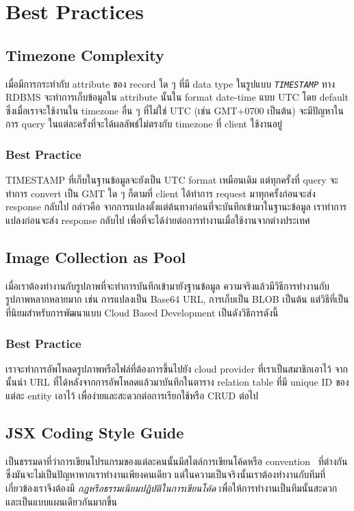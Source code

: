 \section{Best Practices}
\subsection{Timezone Complexity}
เมื่อมีการกระทำกับ attribute ของ record ใด ๆ ที่มี data type ในรูปแบบ \textit{\texttt{TIMESTAMP}} ทาง RDBMS จะทำการเก็บข้อมูลใน attribute นั้นใน format date-time แบบ UTC โดย default ซึ่งเมื่อเราจะใช้งานใน timezone อื่น ๆ ที่ไม่ใช่ UTC (เช่น GMT+0700 เป็นต้น) จะมีปัญหาในการ query ในแต่ละครั้งที่จะได้ผลลัพธ์ไม่ตรงกับ timezone ที่ client ใช้งานอยู่

\subsubsection{Best Practice}
TIMESTAMP ที่เก็บในฐานข้อมูลจะยังเป็น UTC format เหมือนเดิม แต่ทุกครั้งที่ query จะทำการ convert เป็น GMT ใด ๆ ก็ตามที่ client ได้ทำการ request มาทุกครั้งก่อนจะส่ง response กลับไป กล่าวคือ จากการแปลงตั้งแต่ต้นทางก่อนที่จะบันทึกเข้ามาในฐานะข้อมูล เราทำการแปลงก่อนจะส่ง response กลับไป เพื่อที่จะได้ง่ายต่อการทำงานเมื่อใช้งานจากต่างประเทศ

\subsection{Image Collection as Pool}
เมื่อเราต้องทำงานกับรูปภาพที่จะทำการบันทึกเข้ามายังฐานข้อมูล ความจริงแล้วมีวิธีการทำงานกับรูปภาพหลากหลายมาก เช่น การแปลงเป็น Base64 URL, การเก็บเป็น BLOB เป็นต้น แต่วิธีที่เป็นที่นิยมสำหรับการพัฒนาแบบ Cloud Based Development เป็นดังวิธีการดังนี้

\subsubsection{Best Practice}
เราจะทำการอัพโหลดรูปภาพหรือไฟล์ที่ต้องการขึ้นไปยัง cloud provider ที่เราเป็นสมาชิกเอาไว้ จากนั้นนำ URL ที่ได้หลังจากการอัพโหลดแล้วมาบันทึกในตาราง relation table ที่มี unique ID ของแต่ละ entity เอาไว้ เพื่อง่ายและสะดวกต่อการเรียกใช้หรือ CRUD ต่อไป

\subsection{JSX Coding Style Guide}
เป็นธรรมดาที่ว่าการเขียนโปรแกรมของแต่ละคนนั้นมีสไตล์การเขียนโค้ดหรือ convention~\cite{convention} ที่ต่างกัน ซึ่งมันจะไม่เป็นปัญหาหากเราทำงานเพียงคนเดียว แต่ในความเป็นจริงนั้นเราต้องทำงานกับทีมที่เกี่ยวข้องเราจึงต้องมี \textit{กฏหรือธรรมเนียมปฏิบัติในการเขียนโค้ด} เพื่อให้การทำงานเป็นทีมนั้นสะดวกและเป็นแบบแผนเดียวกันมากขึ้น

